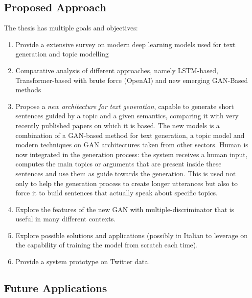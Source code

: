 \subsection{Proposed Approach}
The thesis has multiple goals and objectives:
\begin{enumerate}
	\item Provide a extensive survey on modern deep learning models used for text generation and topic modelling
	\item Comparative analysis of different approaches, namely LSTM-based, Transformer-based with brute force (OpenAI) and new emerging GAN-Based methods
	\item Propose a \textit{new architecture for text generation}, capable to generate short sentences guided by a topic and a given semantics, comparing it with very recently published papers on which it is based. The new models is a combination of a GAN-based method for text generation, a topic model and modern techniques on GAN architectures taken from other sectors. Human is now integrated in the generation process: the system receives a human input, computes the main topics or arguments that are present inside these sentences and use them as guide towards the generation. This is used not only to help the generation process to create longer utterances but also to force it to build sentences that actually speak about specific topics.
	\item Explore the features of the new GAN with multiple-discriminator that is useful in many different contexts. 
	\item Explore possible solutions and applications (possibly in Italian to leverage on the capability of training the model from scratch each time). 
	\item Provide a system prototype on Twitter data.
	
\end{enumerate}

\subsection{Future Applications}

